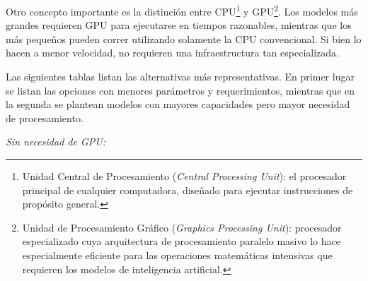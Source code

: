 \documentclass[
  spanish,
]{article}
\begin{document}
Otro concepto importante es la distinción entre CPU\footnote{Unidad Central de Procesamiento
(\emph{Central Processing Unit}): el procesador principal de cualquier computadora,
diseñado para ejecutar instrucciones de propósito general.}
y GPU\footnote{Unidad de Procesamiento Gráfico (\emph{Graphics Processing Unit}):
procesador especializado cuya arquitectura de procesamiento paralelo masivo lo hace especialmente
eficiente para las operaciones matemáticas intensivas que requieren los modelos de inteligencia artificial.}.
Los modelos más grandes requieren GPU para ejecutarse en tiempos razonables, mientras que los más pequeños
pueden correr utilizando solamente la CPU convencional.
Si bien lo hacen a menor velocidad, no requieren una infraestructura tan especializada.

Las siguientes tablas listan las alternativas más representativas.
En primer lugar se listan las opciones con menores parámetros y requerimientos,
mientras que en la segunda se plantean modelos con mayores capacidades pero
mayor necesidad de procesamiento.

\medskip
\noindent\textit{Sin necesidad de GPU:}
\end{document}
